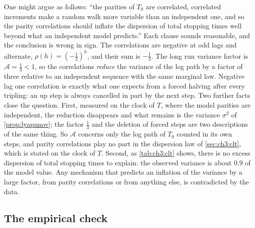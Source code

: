 \begin{remark}\label{rem:ch3:variance}
One might argue as follows: ``the parities of $T_0$ are correlated, correlated
increments make a random walk more variable than an independent one, and so
the parity correlations should inflate the dispersion of total stopping times well
beyond what an independent model predicts.'' Each clause sounds reasonable, and
the conclusion is wrong in sign. The correlations are negative at odd lags and
alternate, $\rho(h)=(-\frac12)^h$, and their sum is $-\frac13$. The long run
variance factor is $\mathcal{A}=\frac13<1$, so the correlations \emph{reduce}
the variance of the log path by a factor of three relative to an independent
sequence with the same marginal law. Negative lag one correlation is exactly
what one expects from a forced halving after every tripling: an up step is
always cancelled in part by the next step. Two further facts close the
question. First, measured on the clock of $T$, where the model parities are
independent, the reduction disappears and what remains is the variance
$\sigma^2$ of \cref{prop:lyapunov}; the factor $\frac13$ and the deletion of
forced steps are two descriptions of the same thing. So $\mathcal{A}$ concerns
only the log path of $T_0$ counted in its own steps, and parity correlations
play no part in the dispersion law of \cref{sec:ch3:clt}, which is stated on
the clock of $T$. Second, as
\cref{tab:ch3:clt} shows, there is no excess dispersion of total stopping times to
explain: the observed variance is about $0.9$ of the model value. Any
mechanism that predicts an inflation of the variance by a large factor, from
parity correlations or from anything else, is contradicted by the data.
\end{remark}

\subsection{The empirical check}

